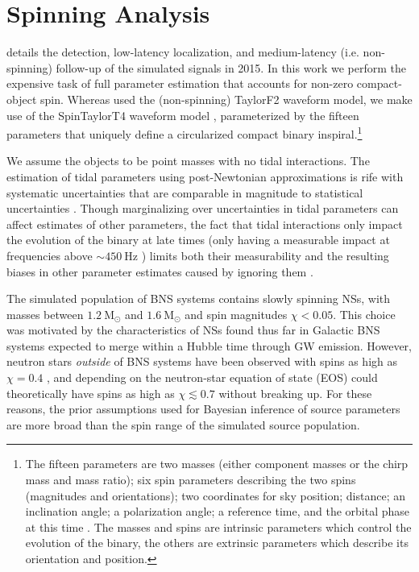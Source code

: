 \section{Spinning Analysis}
\label{sec:spin}

\citet{Singer_2014} details the detection, low-latency localization, and medium-latency (i.e. non-spinning) follow-up of the simulated signals in 2015. In this work we perform the expensive task of full parameter estimation that accounts for non-zero compact-object spin. Whereas \citet{Singer_2014} used the (non-spinning) TaylorF2 waveform model, we make use of the SpinTaylorT4 waveform model \citep{Buonanno_2003,Buonanno_2009}, parameterized by the fifteen parameters that uniquely define a circularized compact binary inspiral.\footnote{The fifteen parameters are two masses (either component masses or the chirp mass and mass ratio); six spin parameters describing the two spins (magnitudes and orientations); two coordinates for sky position; distance; an inclination angle; a polarization angle; a reference time, and the orbital phase at this time \citep[see][for more details]{Veitch_2015}. The masses and spins are intrinsic parameters which control the evolution of the binary, the others are extrinsic parameters which describe its orientation and position.}

We assume the objects to be point masses with no tidal interactions.  The estimation of tidal parameters using post-Newtonian approximations is rife with systematic uncertainties that are comparable in magnitude to statistical uncertainties \cite{Wade_2014}. Though marginalizing over uncertainties in tidal parameters can affect estimates of other parameters, the fact that tidal interactions only impact the evolution of the binary at late times (only having a measurable impact at frequencies above $\sim450~\mathrm{Hz}$ \citealt{Hinderer_2010}) limits both their measurability and the resulting biases in other parameter estimates caused by ignoring them \cite{Damour_2012}.

The simulated population of BNS systems contains slowly spinning NSs, with masses between $1.2~\mathrm{M}_\odot$ and $1.6~\mathrm{M}_\odot$ and spin magnitudes $\chi < 0.05$.  This choice was motivated by the characteristics of NSs found thus far in Galactic BNS systems expected to merge within a Hubble time through GW emission. However, neutron stars \emph{outside} of BNS systems have been observed with spins as high as $\chi = 0.4$ \citep{Hessels_2006,Brown_2012}, and depending on the neutron-star equation of state (EOS) could theoretically have spins as high as $\chi \lesssim 0.7$ \citep{Lo_2011} without breaking up.  For these reasons, the prior assumptions used for Bayesian inference of source parameters are more broad than the spin range of the simulated source population.

